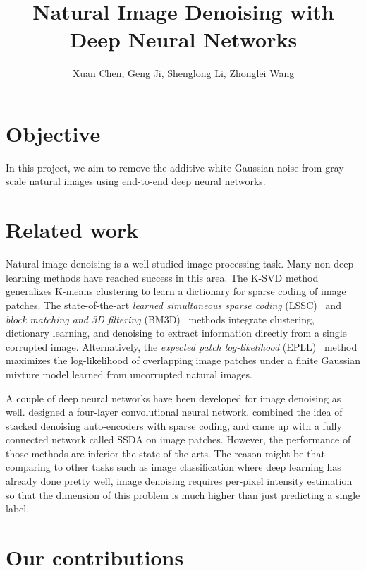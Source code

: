 \documentclass[11pt]{article}
\begin{document}
\title{\textbf{Natural Image Denoising with Deep Neural Networks}}
\author{Xuan Chen, Geng Ji, Shenglong Li, Zhonglei Wang}
\date{}
\maketitle
 
\section{Objective}
In this project, we aim to remove the additive white Gaussian noise from gray-scale natural images using end-to-end deep neural networks.

\section{Related work}
Natural image denoising is a well studied image processing task. 
Many non-deep-learning methods have reached success in this area.
The K-SVD method~\citep{elad2006image} generalizes K-means clustering to learn a dictionary for sparse coding of image patches.
The state-of-the-art \emph{learned simultaneous sparse coding} (LSSC)~\citep{mairal2009non} and \emph{block matching and 3D filtering} (BM3D)~\citep{dabov2008image} methods integrate clustering, dictionary learning, and denoising to extract information directly from a single corrupted image.
Alternatively, the \emph{expected patch log-likelihood}  (EPLL)~\citep{zoran2011learning} method maximizes the log-likelihood of overlapping image patches under a finite Gaussian mixture model learned from uncorrupted natural images.

A couple of deep neural networks have been developed for image denoising as well. 
\cite{jain2009natural} designed a four-layer convolutional neural network.
\cite{xie2012image} combined the idea of stacked denoising auto-encoders with sparse coding, and came up with a fully connected network called SSDA on image patches.
However, the performance of those methods are inferior the state-of-the-arts.
The reason might be that comparing to other tasks such as image classification where deep learning has already done pretty well, image denoising requires per-pixel intensity estimation so that the dimension of this problem is much higher than just predicting a single label.

\section{Our contributions}
\end{document}
